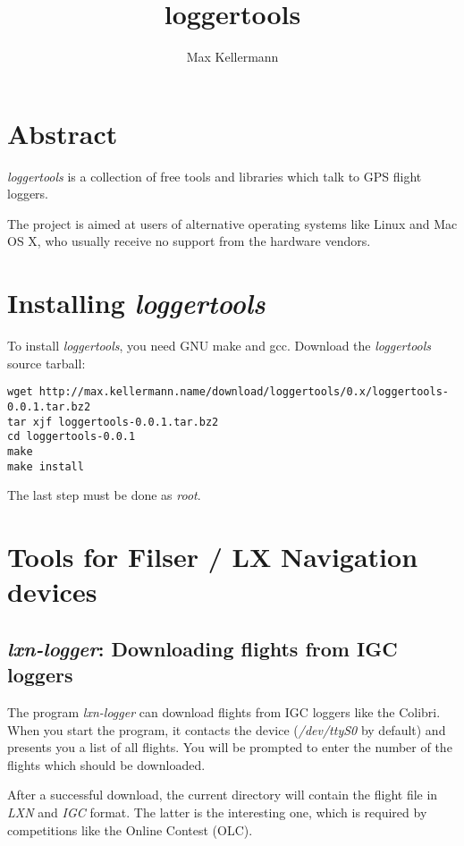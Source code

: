 \documentclass{article}
\title{loggertools}
\author{Max Kellermann}
\begin{document}
\maketitle
\tableofcontents


\section{Abstract}

{\em loggertools} is a collection of free tools and libraries which
talk to GPS flight loggers.

The project is aimed at users of alternative operating systems like
Linux and Mac OS X, who usually receive no support from the hardware
vendors.


\section{Installing {\em loggertools}}

To install {\em loggertools}, you need GNU make and gcc.  Download the
{\em loggertools} source tarball:

\begin{verbatim}
wget http://max.kellermann.name/download/loggertools/0.x/loggertools-0.0.1.tar.bz2
tar xjf loggertools-0.0.1.tar.bz2
cd loggertools-0.0.1
make
make install
\end{verbatim}

The last step must be done as {\em root}.


\section{Tools for Filser / LX Navigation devices}

\subsection{{\em lxn-logger}: Downloading flights from IGC loggers}

The program {\em lxn-logger} can download flights from IGC loggers
like the Colibri.  When you start the program, it contacts the device
({\em /dev/ttyS0} by default) and presents you a list of all flights.
You will be prompted to enter the number of the flights which should
be downloaded.

After a successful download, the current directory will contain the
flight file in {\em LXN} and {\em IGC} format.  The latter is the
interesting one, which is required by competitions like the Online
Contest (OLC).
\end{document}
